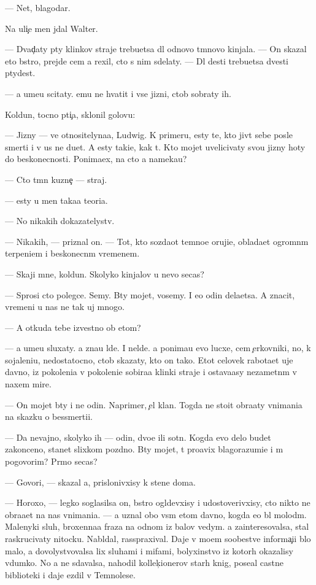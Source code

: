 \documentclass[10pt]{book}
\begin{document}
— Net, blagodar{\iu}.

Na uli{\c}e men{\ia} jdal Walter.

— Dvad{\c}aty p{\ia}ty klinkov straje{\y} trebu{\y}etsa dl{\ia} odnovo t{\e}mnovo kinjala. — On skazal eto b{\yi}stro, prejde cem {\y}a rexil, cto s nim sdelaty. — Dl{\ia} des{\ia}ti trebu{\y}etsa dvesti p{\ia}tydes{\ia}t.

— {\Y}a ume{\y}u scitaty. {\Y}emu ne hvatit i vse{\y} jizni, ctob{\yi} sobraty ih.

Koldun, tocno pti{\c}a, sklonil golovu:

— Jizny — ve{\x} otnositelyna{\y}a, Ludwig. K primeru, {\y}esty te, kto jiv{\e}t sebe posle smerti i v us ne du{\y}et. A {\y}esty taki{\y}e, kak t{\yi}. Kto mojet uvelicivaty svo{\y}u jizny hoty do beskonecnosti. Ponima{\y}ex, na cto {\y}a nameka{\y}u?

— Cto t{\e}mn{\yi}{\y} kuzne{\c} — straj.

— {\Y}esty u men{\ia} taka{\y}a teori{\y}a.

— No nikakih dokazatelystv.

— Nikakih, — priznal on. — Tot, kto sozda{\y}ot temno{\y}e oruji{\y}e, oblada{\y}et ogromn{\yi}m terpeni{\y}em i beskonecn{\yi}m vremenem.

— Skaji mne, koldun. Skolyko kinjalov u nevo se{\y}cas?

— Sprosi cto polegce. Semy. B{\yi}ty mojet, vosemy. I {\y}e{\x}o odin dela{\y}etsa. A znacit, vremeni u nas ne tak uj mnogo.

— A otkuda tebe izvestno ob etom?

— {\Y}a ume{\y}u sluxaty. {\Y}a zna{\y}u l{\iu}de{\y}. I nel{\iu}de{\y}. {\Y}a ponima{\y}u {\y}evo lucxe, cem {\c}erkovniki, no, k sojaleni{\y}u, nedostatocno, ctob{\yi} skazaty, kto on tako{\y}. Etot celovek rabota{\y}et uje davno, iz pokoleni{\y}a v pokoleni{\y}e sobira{\y}a klinki straje{\y} i ostava{\y}asy nezametn{\yi}m v naxem mire.

— On mojet b{\yi}ty i ne odin. Naprimer, {\c}el{\yi}{\y} klan. Togda ne sto{\y}it obra{\x}aty vnimani{\y}a na skazku o bessmerti{\y}i.

— Da nevajno, skolyko ih — odin, dvo{\y}e ili sotn{\ia}. Kogda {\y}evo delo budet zakonceno, stanet slixkom pozdno. B{\yi}ty mojet, t{\yi} pro{\y}avix blagorazumi{\y}e i m{\yi} pogovorim? Pr{\ia}mo se{\y}cas?

— Govori, — skazal {\y}a, prislonivxisy k stene doma.

— Horoxo, — legko soglasilsa on, b{\yi}stro ogl{\ia}devxisy i udostoverivxisy, cto nikto ne obra{\x}a{\y}et na nas vnimani{\y}a. — {\Y}a uznal obo vs{\e}m etom davno, kogda {\y}e{\x}o b{\yi}l molod{\yi}m. Malenyki{\y} sluh, broxenna{\y}a fraza na odnom iz balov vedym. {\Y}a zainteresovalsa, stal raskrucivaty nitocku. Nabl{\iu}dal, rasspraxival. Daje v mo{\y}em soob{\x}estve informa{\c}i{\y}i b{\yi}lo malo, {\y}a dovolystvovalsa lix sluhami i mifami, bolyxinstvo iz kotor{\yi}h okazalisy v{\yi}dumko{\y}. No {\y}a ne sdavalsa, nahodil kollek{\c}ionerov star{\yi}h knig, pose{\x}al castn{\yi}{\y}e biblioteki i daje {\y}ezdil v Temnoles{\y}e.
\end{document}
